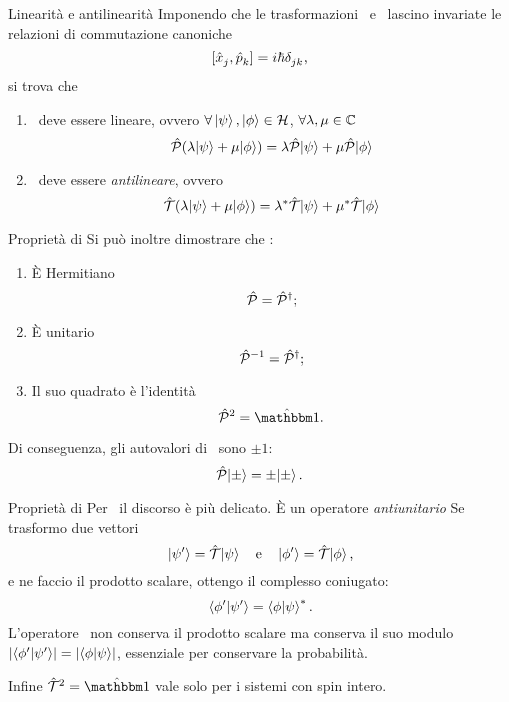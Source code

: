 \begin{frame}{Linearità e antilinearità}
    Imponendo che le trasformazioni \hP\ e \hT\ lascino invariate le relazioni di commutazione canoniche
    \begin{equation*}
        \comm*{\tensor{\hx}{_j}}{\tensor{\hp}{_k}}\! = i\hbar\tensor{\delta}{_j_k}
        \mycomma
    \end{equation*}
    si trova che 
    \begin{enumerate}[label=\mybullet]
        \item \hP\ deve essere lineare, ovvero $\forall\ket{\psi},\ket{\phi}\in\mathcal{H}$, $\forall\lambda,\mu\in\mathbb{C}$
            $$
                \hP\pqty{\lambda\!\ket{\psi} + \mu\!\ket{\phi}}
                = \lambda\hP\!\ket{\psi} + \mu\hP\!\ket{\phi}
            $$
        \item \hT\ deve essere \emph{antilineare}, ovvero
            $$
                \hT\pqty{\lambda\!\ket{\psi} + \mu\!\ket{\phi}}
                = \lambda^*\hT\!\ket{\psi} + \mu^*\hT\!\ket{\phi}
            $$
    \end{enumerate}
\end{frame}

\begin{frame}{Proprietà di \hP}
    Si può inoltre dimostrare che \hP :
    \begin{enumerate}[label=\mybullet]
        \pause
        \item È Hermitiano $$\mathcal{\hat{P}} = \mathcal{\hat{P}}^\dag\text{;}$$
        \pause
        \item È unitario $$\mathcal{\hat{P}}^{-1} = \mathcal{\hat{P}}^\dag\text{;}$$
        \pause
        \item Il suo quadrato è l'identità $$\hP^2 = \hidM\myperiod$$
    \end{enumerate}
    \pause
    Di conseguenza, gli autovalori di \hP\ sono $\pm1$: $$\mathcal{\hat{P}}\!\ket{\pm} = \pm\!\ket{\pm}.$$
\end{frame}

\begin{frame}{Proprietà di \hT}
    Per \hT\ il discorso è più delicato. È un operatore \emph{antiunitario}
    Se trasformo due vettori
    $$\ket*{\psi'} = \mathcal{\hat{T}}\!\ket{\psi}\quad\text{e}\quad\ket*{\phi'} = \mathcal{\hat{T}}\!\ket{\phi}\text{,}$$
    \pause
    e ne faccio il prodotto scalare, ottengo il complesso coniugato:
    $$\braket*{\phi'}{\psi'} = \braket{\phi}{\psi}^*\text{.}$$
    \pause
    L'operatore \hT\ non conserva il prodotto scalare ma conserva il suo modulo
    $\abs*{\!\braket*{\phi'}{\psi'}}\! = \abs{\braket{\phi}{\psi}}$,
    essenziale per conservare la probabilità.

    \pause 
    Infine $\hT^2 = \hidM$ vale solo per i sistemi con spin intero.
\end{frame}

